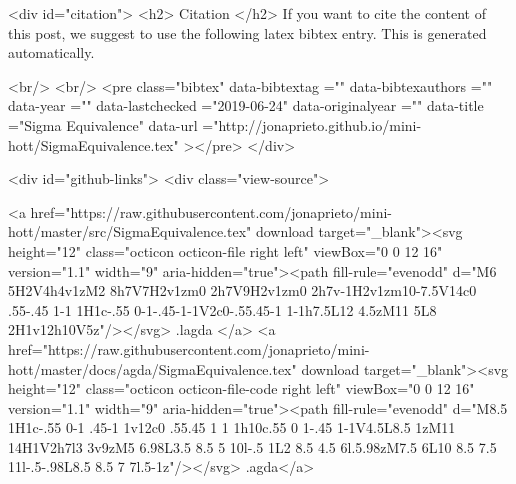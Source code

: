   
  <div id="citation">
  <h2> Citation </h2>
  If you want to cite the content of this post,
  we suggest to use the following latex bibtex entry.
  This is generated automatically.

  <br/>
  <br/>
  <pre class="bibtex"
       data-bibtextag =""
       data-bibtexauthors =""
       data-year =""
       data-lastchecked ="2019-06-24"
       data-originalyear =""
       data-title ="Sigma Equivalence"
       data-url ="http://jonaprieto.github.io/mini-hott/SigmaEquivalence.tex"
  ></pre>
  </div>
  

  <div id="github-links">
    <div class="view-source">
      
        <a href="https://raw.githubusercontent.com/jonaprieto/mini-hott/master/src/SigmaEquivalence.tex" download target="_blank"><svg height="12" class="octicon octicon-file right left" viewBox="0 0 12 16" version="1.1" width="9" aria-hidden="true"><path fill-rule="evenodd" d="M6 5H2V4h4v1zM2 8h7V7H2v1zm0 2h7V9H2v1zm0 2h7v-1H2v1zm10-7.5V14c0 .55-.45 1-1 1H1c-.55 0-1-.45-1-1V2c0-.55.45-1 1-1h7.5L12 4.5zM11 5L8 2H1v12h10V5z"/></svg> .lagda </a>
        <a href="https://raw.githubusercontent.com/jonaprieto/mini-hott/master/docs/agda/SigmaEquivalence.tex" download target="_blank"><svg height="12" class="octicon octicon-file-code right left" viewBox="0 0 12 16" version="1.1" width="9" aria-hidden="true"><path fill-rule="evenodd" d="M8.5 1H1c-.55 0-1 .45-1 1v12c0 .55.45 1 1 1h10c.55 0 1-.45 1-1V4.5L8.5 1zM11 14H1V2h7l3 3v9zM5 6.98L3.5 8.5 5 10l-.5 1L2 8.5 4.5 6l.5.98zM7.5 6L10 8.5 7.5 11l-.5-.98L8.5 8.5 7 7l.5-1z"/></svg> .agda</a>
      
